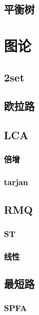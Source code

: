 \documentclass[10pt]{article}
\begin{document}
\subsection{平衡树}




\section{图论}
\subsection{2set}


\subsection{欧拉路}
\subsection{LCA}
\subsubsection{倍增}


\subsubsection{tarjan}

\subsection{RMQ}
\subsubsection{ST}

\subsubsection{线性}

\subsection{最短路}
\subsubsection{SPFA}

\end{document}
